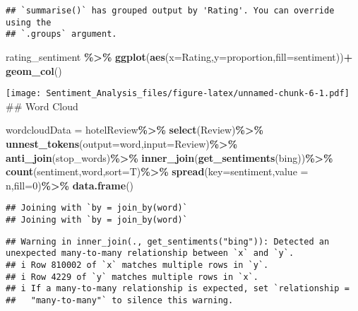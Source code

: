 \documentclass[
]{article}
\newenvironment{Shaded}{\begin{snugshade}}{\end{snugshade}}
\newcommand{\AttributeTok}[1]{\textcolor[rgb]{0.13,0.29,0.53}{#1}}
\newcommand{\DecValTok}[1]{\textcolor[rgb]{0.00,0.00,0.81}{#1}}
\newcommand{\FunctionTok}[1]{\textcolor[rgb]{0.13,0.29,0.53}{\textbf{#1}}}
\newcommand{\NormalTok}[1]{#1}
\newcommand{\OtherTok}[1]{\textcolor[rgb]{0.56,0.35,0.01}{#1}}
\newcommand{\SpecialCharTok}[1]{\textcolor[rgb]{0.81,0.36,0.00}{\textbf{#1}}}
\newcommand{\StringTok}[1]{\textcolor[rgb]{0.31,0.60,0.02}{#1}}
\begin{document}
\begin{verbatim}
## `summarise()` has grouped output by 'Rating'. You can override using the
## `.groups` argument.
\end{verbatim}

\begin{Shaded}
\begin{Highlighting}[]
\NormalTok{rating\_sentiment }\SpecialCharTok{\%\textgreater{}\%}
  \FunctionTok{ggplot}\NormalTok{(}\FunctionTok{aes}\NormalTok{(}\AttributeTok{x=}\NormalTok{Rating,}\AttributeTok{y=}\NormalTok{proportion,}\AttributeTok{fill=}\NormalTok{sentiment))}\SpecialCharTok{+}
  \FunctionTok{geom\_col}\NormalTok{()}
\end{Highlighting}
\end{Shaded}

\texttt{[image: Sentiment\_Analysis\_files/figure-latex/unnamed-chunk-6-1.pdf]}
\#\# Word Cloud

\begin{Shaded}
\begin{Highlighting}[]
\NormalTok{wordcloudData }\OtherTok{=} 
\NormalTok{  hotelReview}\SpecialCharTok{\%\textgreater{}\%}
  \FunctionTok{select}\NormalTok{(Review)}\SpecialCharTok{\%\textgreater{}\%}
  \FunctionTok{unnest\_tokens}\NormalTok{(}\AttributeTok{output=}\NormalTok{word,}\AttributeTok{input=}\NormalTok{Review)}\SpecialCharTok{\%\textgreater{}\%}
  \FunctionTok{anti\_join}\NormalTok{(stop\_words)}\SpecialCharTok{\%\textgreater{}\%}
  \FunctionTok{inner\_join}\NormalTok{(}\FunctionTok{get\_sentiments}\NormalTok{(}\StringTok{\textquotesingle{}bing\textquotesingle{}}\NormalTok{))}\SpecialCharTok{\%\textgreater{}\%}
  \FunctionTok{count}\NormalTok{(sentiment,word,}\AttributeTok{sort=}\NormalTok{T)}\SpecialCharTok{\%\textgreater{}\%}
  \FunctionTok{spread}\NormalTok{(}\AttributeTok{key=}\NormalTok{sentiment,}\AttributeTok{value =}\NormalTok{ n,}\AttributeTok{fill=}\DecValTok{0}\NormalTok{)}\SpecialCharTok{\%\textgreater{}\%}
  \FunctionTok{data.frame}\NormalTok{()}
\end{Highlighting}
\end{Shaded}

\begin{verbatim}
## Joining with `by = join_by(word)`
## Joining with `by = join_by(word)`
\end{verbatim}

\begin{verbatim}
## Warning in inner_join(., get_sentiments("bing")): Detected an unexpected many-to-many relationship between `x` and `y`.
## i Row 810002 of `x` matches multiple rows in `y`.
## i Row 4229 of `y` matches multiple rows in `x`.
## i If a many-to-many relationship is expected, set `relationship =
##   "many-to-many"` to silence this warning.
\end{verbatim}
\end{document}
